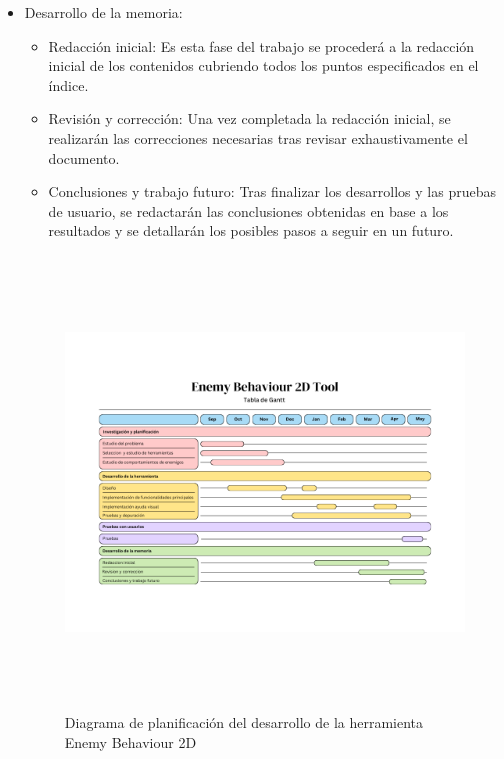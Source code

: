 \begin{itemize}
\begin{itemize}
	\end{itemize}
   \item Desarrollo de la memoria: 
	\begin{itemize}
	    \item  Redacción inicial: Es esta fase del trabajo se procederá a la redacción inicial de los contenidos cubriendo todos los puntos especificados en el índice.
	    \item Revisión y corrección: Una vez completada la redacción inicial, se realizarán las correcciones necesarias tras revisar exhaustivamente el documento.
	    \item Conclusiones y trabajo futuro: Tras finalizar los desarrollos y las pruebas de usuario, se redactarán las conclusiones obtenidas en base a los resultados y se detallarán los posibles pasos a seguir en un futuro.
	\end{itemize}
\begin{figure}[h!]
	\centering
	\includegraphics[height=12cm]{Imagenes/GanttChart}
	\caption{Diagrama de planificación del desarrollo de la herramienta Enemy Behaviour 2D}
	\label{fig:GanttEnemyBehaviour2D}
\end{figure}

\end{itemize}
